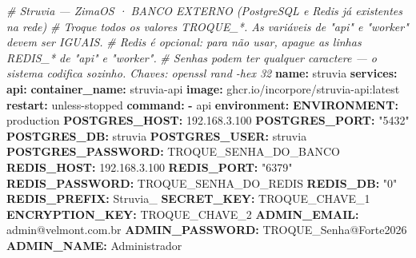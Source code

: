 \documentclass[
  10pt,
]{article}
\newenvironment{Shaded}{\begin{snugshade}}{\end{snugshade}}
\newcommand{\AttributeTok}[1]{\textcolor[rgb]{0.13,0.29,0.53}{#1}}
\newcommand{\CommentTok}[1]{\textcolor[rgb]{0.56,0.35,0.01}{\textit{#1}}}
\newcommand{\FloatTok}[1]{\textcolor[rgb]{0.00,0.00,0.81}{#1}}
\newcommand{\FunctionTok}[1]{\textcolor[rgb]{0.13,0.29,0.53}{\textbf{#1}}}
\newcommand{\KeywordTok}[1]{\textcolor[rgb]{0.13,0.29,0.53}{\textbf{#1}}}
\newcommand{\StringTok}[1]{\textcolor[rgb]{0.31,0.60,0.02}{#1}}
\begin{document}
\begin{Shaded}
\begin{Highlighting}[]
\CommentTok{\# Struvia — ZimaOS · BANCO EXTERNO (PostgreSQL e Redis já existentes na rede)}
\CommentTok{\# Troque todos os valores TROQUE\_*. As variáveis de "api" e "worker" devem ser IGUAIS.}
\CommentTok{\# Redis é opcional: para não usar, apague as linhas REDIS\_* de "api" e "worker".}
\CommentTok{\# Senhas podem ter qualquer caractere — o sistema codifica sozinho. Chaves: openssl rand {-}hex 32}
\FunctionTok{name}\KeywordTok{:}\AttributeTok{ struvia}
\FunctionTok{services}\KeywordTok{:}
\AttributeTok{  }\FunctionTok{api}\KeywordTok{:}
\AttributeTok{    }\FunctionTok{container\_name}\KeywordTok{:}\AttributeTok{ struvia{-}api}
\AttributeTok{    }\FunctionTok{image}\KeywordTok{:}\AttributeTok{ ghcr.io/incorpore/struvia{-}api:latest}
\AttributeTok{    }\FunctionTok{restart}\KeywordTok{:}\AttributeTok{ unless{-}stopped}
\AttributeTok{    }\FunctionTok{command}\KeywordTok{:}
\AttributeTok{      }\KeywordTok{{-}}\AttributeTok{ api}
\AttributeTok{    }\FunctionTok{environment}\KeywordTok{:}
\AttributeTok{      }\FunctionTok{ENVIRONMENT}\KeywordTok{:}\AttributeTok{ production}
\AttributeTok{      }\FunctionTok{POSTGRES\_HOST}\KeywordTok{:}\AttributeTok{ }\FloatTok{192.168.3.100}
\AttributeTok{      }\FunctionTok{POSTGRES\_PORT}\KeywordTok{:}\AttributeTok{ }\StringTok{"5432"}
\AttributeTok{      }\FunctionTok{POSTGRES\_DB}\KeywordTok{:}\AttributeTok{ struvia}
\AttributeTok{      }\FunctionTok{POSTGRES\_USER}\KeywordTok{:}\AttributeTok{ struvia}
\AttributeTok{      }\FunctionTok{POSTGRES\_PASSWORD}\KeywordTok{:}\AttributeTok{ TROQUE\_SENHA\_DO\_BANCO}
\AttributeTok{      }\FunctionTok{REDIS\_HOST}\KeywordTok{:}\AttributeTok{ }\FloatTok{192.168.3.100}
\AttributeTok{      }\FunctionTok{REDIS\_PORT}\KeywordTok{:}\AttributeTok{ }\StringTok{"6379"}
\AttributeTok{      }\FunctionTok{REDIS\_PASSWORD}\KeywordTok{:}\AttributeTok{ TROQUE\_SENHA\_DO\_REDIS}
\AttributeTok{      }\FunctionTok{REDIS\_DB}\KeywordTok{:}\AttributeTok{ }\StringTok{"0"}
\AttributeTok{      }\FunctionTok{REDIS\_PREFIX}\KeywordTok{:}\AttributeTok{ Struvia\_}
\AttributeTok{      }\FunctionTok{SECRET\_KEY}\KeywordTok{:}\AttributeTok{ TROQUE\_CHAVE\_1}
\AttributeTok{      }\FunctionTok{ENCRYPTION\_KEY}\KeywordTok{:}\AttributeTok{ TROQUE\_CHAVE\_2}
\AttributeTok{      }\FunctionTok{ADMIN\_EMAIL}\KeywordTok{:}\AttributeTok{ admin@velmont.com.br}
\AttributeTok{      }\FunctionTok{ADMIN\_PASSWORD}\KeywordTok{:}\AttributeTok{ TROQUE\_Senha@Forte2026}
\AttributeTok{      }\FunctionTok{ADMIN\_NAME}\KeywordTok{:}\AttributeTok{ Administrador}

\end{Highlighting}
\end{Shaded}
\end{document}
